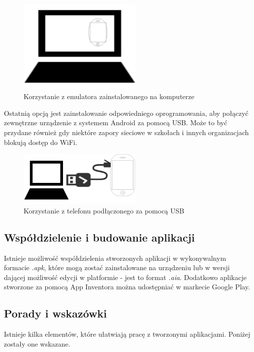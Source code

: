 \begin{figure}[H] 
\centering\includegraphics[width=6cm]{figures/option2emulator}
\caption{Korzystanie z emulatora zainstalowanego na komputerze}
\end{figure}

Ostatnią opcją jest zainstalowanie odpowiedniego oprogramowania, aby połączyć zewnętrzne urządzenie z systemem Android za pomocą USB. Może to być przydane również gdy niektóre zapory sieciowe w szkołach i innych organizacjach blokują dostęp do WiFi.\cite{android:40}

\begin{figure}[H] 
\centering\includegraphics[width=6cm]{figures/option3usb}
\caption{Korzystanie z telefonu podłączonego za pomocą USB}
\end{figure}

\subsection{Współdzielenie i budowanie aplikacji}

Istnieje możliwość współdzielenia stworzonych aplikacji w wykonywalnym formacie \emph{.apk}, które mogą zostać zainstalowane na urządzeniu lub w wersji dającej możliwość edycji w platformie - jest to format \emph{.aia}. Dodatkowo aplikacje stworzone za pomocą App Inventora można udostępniać w markecie Google Play.\cite{android:41}

\subsection{Porady i wskazówki}

Istnieje kilka elementów, które ułatwiają pracę z tworzonymi aplikacjami. Poniżej zostały one wskazane.\cite{android:42}

